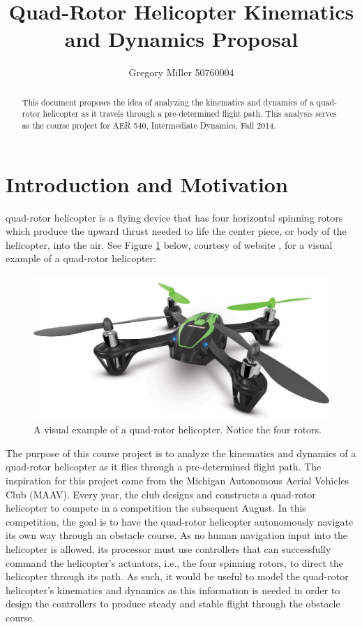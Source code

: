 \documentclass[journal]{IEEEtran}
\begin{document}
\title{Quad-Rotor Helicopter Kinematics and Dynamics Proposal}

\author{{Gregory Miller 50760004}}

{}

\maketitle

\begin{abstract}
This document proposes the idea of analyzing the kinematics and dynamics of a quad-rotor helicopter
as it travels through a pre-determined flight path. This analysis serves as the course project for 
AER 540, Intermediate Dynamics, Fall 2014. 
\end{abstract}

\IEEEpeerreviewmaketitle

\section{Introduction and Motivation}
\label{sec:intro_section}

quad-rotor helicopter is a flying device that has four horizontal spinning
rotors which produce the upward thrust needed to life the center piece, or body of the 
helicopter, into the air. See Figure \ref{fig:quad_intro} below, courtesy of website \cite{quad_intro},
for a visual example of a quad-rotor helicopter:

\begin{figure}[ht]
    \centering
        \includegraphics[width=.25\textwidth]{quad_intro}
    \caption{A visual example of a quad-rotor helicopter. Notice the four rotors.}
    \label{fig:quad_intro}
\end{figure}

The purpose of this course project is to analyze the kinematics and dynamics of a quad-rotor
helicopter as it flies through a pre-determined flight path. The inspiration for this
project came from the Michigan Autonomous Aerial Vehicles Club (MAAV). Every year,
the club designs and constructs a quad-rotor helicopter to compete in a competition
the subsequent August. In this competition, the goal is to have the quad-rotor
helicopter autonomously navigate its own way through an obstacle course. As no
human navigation input into the helicopter is allowed, its processor must use controllers
that can successfully command the helicopter's actuators, i.e., the four spinning
rotors, to direct the helicopter through its path. As such, it would be useful to 
model the quad-rotor helicopter's kinematics and dynamics as this information is
needed in order to design the controllers to produce steady and stable flight through the
obstacle course.   
\end{document}
